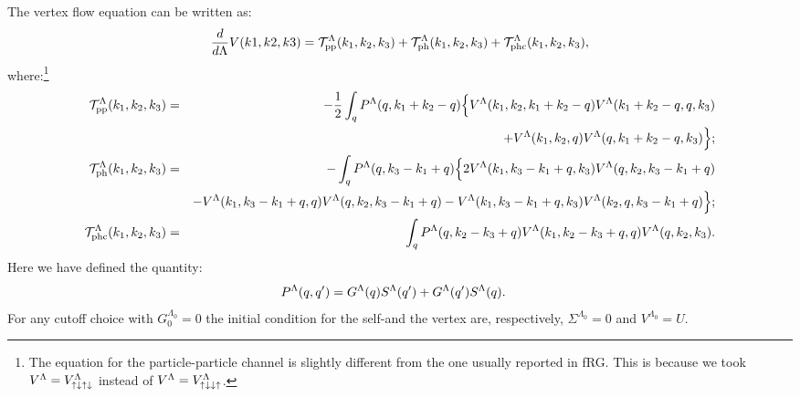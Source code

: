  \begin{widetext} 
The vertex flow equation can be written as: 
\begin{align}
 \frac{d}{d\Lambda}V(k1,k2,k3) =  \mathcal{T}^{\Lambda}_{\mathrm{pp} }(k_1,k_2,k_3) +  
  \mathcal{T}^{\Lambda}_{\mathrm{ph} }(k_1,k_2,k_3) + \mathcal{T}^{\Lambda}_{\mathrm{phc} }(k_1,k_2,k_3),
\end{align} 
where:\footnote{The equation for the particle-particle channel is slightly different from the one usually reported in fRG. This is because we took $V^{\Lambda}_{\mathrm{} } = V^{\Lambda}_{\mathrm{\uparrow \downarrow \uparrow\downarrow} }$ instead of $V^{\Lambda}_{\mathrm{} } = V^{\Lambda}_{\mathrm{\uparrow\downarrow\downarrow\uparrow} }$.  }
\begin{eqnarray} 
\mathcal{T}^{\Lambda}_{\mathrm{pp} }(k_1,k_2,k_3) &=&-\frac{1}{2} \int_q {P}^{\Lambda}_{\mathrm{} }(q,k_1+k_2-q) \Big\{  V^{\Lambda}_{\mathrm{} }(k_1,k_2,k_1+k_2-q)V^{\Lambda}_{\mathrm{} }(k_1+k_2-q,q,k_3)   \\ 
\nonumber
&&+  V^{\Lambda}_{\mathrm{} }(k_1,k_2,q)V^{\Lambda}_{\mathrm{} }(q,k_1+k_2-q,k_3) \Big\} ; \\  
\mathcal{T} ^{\Lambda}_{\mathrm{ph} }(k_1,k_2,k_3) & =& -\int_q P^{\Lambda}_{\mathrm{} }(q,k_3-k_1+q)
\Big\{ 2 V^{\Lambda}_{\mathrm{} }( k_1,k_3-k_1+q,k_3)  V^{\Lambda}_{\mathrm{} }(q,k_2,k_3-k_1+q) \\
\nonumber
&&- V^{\Lambda}_{\mathrm{} }( k_1,k_3-k_1+q,q)  V^{\Lambda}_{\mathrm{} }(q,k_2,k_3-k_1+q) - V^{\Lambda}_{\mathrm{} }( k_1,k_3-k_1+q,k_3)  V^{\Lambda}_{\mathrm{} }(k_2,q,k_3-k_1+q) \Big\}; \\
\mathcal{T}^{\Lambda}_{\mathrm{phc} }(k_1,k_2,k_3) & =& \int_q P^{\Lambda}_{\mathrm{} }(q,k_2-k_3+q) V^{\Lambda}_{\mathrm{} }(k_1,k_2-k_3+q,q)
V^{\Lambda}_{\mathrm{} }(q,k_2,k_3).
\end{eqnarray} 
Here we have defined the quantity:
\begin{align}
{P }^{\Lambda}_{\mathrm{} }(q,q') &= G^\Lambda(q)S^\Lambda(q') +G^\Lambda(q')S^\Lambda(q).
\end{align} 
For any cutoff choice with $G_0^{\Lambda_0}=0$ the initial condition for the self-and the vertex are, respectively, $\Sigma^{\Lambda_0}=0$ and $V^{\Lambda_0 }= U$. 




\end{widetext} 
